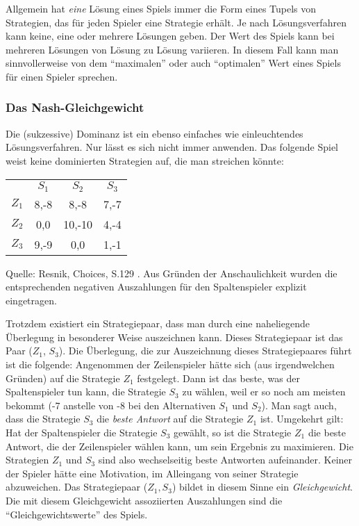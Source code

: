 Allgemein hat {\em eine} Lösung eines Spiels immer die Form
eines Tupels von Strategien, das für jeden Spieler eine Strategie erhält. Je
nach Lösungsverfahren kann keine, eine oder mehrere Lösungen geben. Der Wert
des Spiels kann bei mehreren Lösungen von Lösung zu Lösung variieren. In diesem
Fall kann man sinnvollerweise von dem "`maximalen"' oder auch "`optimalen"' Wert
eines Spiels für einen Spieler sprechen.

\subsubsection{Das Nash-Gleichgewicht}

Die (sukzessive) Dominanz ist ein ebenso einfaches wie einleuchtendes
Lösungsverfahren. Nur lässt es sich nicht immer anwenden. Das folgende Spiel
weist keine dominierten Strategien auf, die man streichen könnte:

\begin{center}
\setlength{\parskip}{0.5cm}
\begin{tabular}{c|c|c|c|}
\multicolumn{1}{c}{} & 
\multicolumn{1}{c}{$S_1$} &
\multicolumn{1}{c}{$S_2$} &
\multicolumn{1}{c}{$S_3$} \\ \cline{2-4}

$Z_1$ & 8,-8 & 8,-8   & 7,-7 \\ \cline{2-4}
$Z_2$ & 0,0  & 10,-10 & 4,-4 \\ \cline{2-4}
$Z_3$ & 9,-9 & 0,0    & 1,-1 \\ \cline{2-4}

\end{tabular}

{\footnotesize Quelle: Resnik, Choices, S.129 \cite[]{resnik:1987}. Aus Gründen
der Anschaulichkeit wurden die entsprechenden negativen Auszahlungen für den
Spaltenspieler explizit eingetragen.}
\end{center}

Trotzdem existiert ein Strategiepaar, dass man durch eine naheliegende
Überlegung in besonderer Weise auszeichnen kann. Dieses Strategiepaar ist das
Paar ($Z_1$, $S_3$). Die Überlegung, die zur Auszeichnung dieses
Strategiepaares führt ist die folgende: Angenommen der Zeilenspieler hätte sich
(aus irgendwelchen Gründen) auf die Strategie $Z_1$ festgelegt. Dann ist das
beste, was der Spaltenspieler tun kann, die Strategie $S_3$ zu wählen, weil er
so noch am meisten bekommt (-7 anstelle von -8 bei den Alternativen $S_1$ und
$S_2$). Man sagt auch, dass die Strategie $S_3$ die {\em beste Antwort} auf die
Strategie $Z_1$ ist. Umgekehrt gilt: Hat der Spaltenspieler die Strategie $S_3$
gewählt, so ist die Strategie $Z_1$ die beste Antwort, die der Zeilenspieler
wählen kann, um sein Ergebnis zu maximieren. Die Strategien $Z_1$ und $S_3$
sind also wechselseitig beste Antworten aufeinander. Keiner der Spieler hätte
eine Motivation, im Alleingang von seiner Strategie abzuweichen. Das
Strategiepaar ($Z_1, S_3$) bildet in diesem Sinne ein {\em Gleichgewicht}. Die
mit diesem Gleichgewicht assoziierten Auszahlungen sind die "`Gleichgewichtswerte"'
des Spiels.

